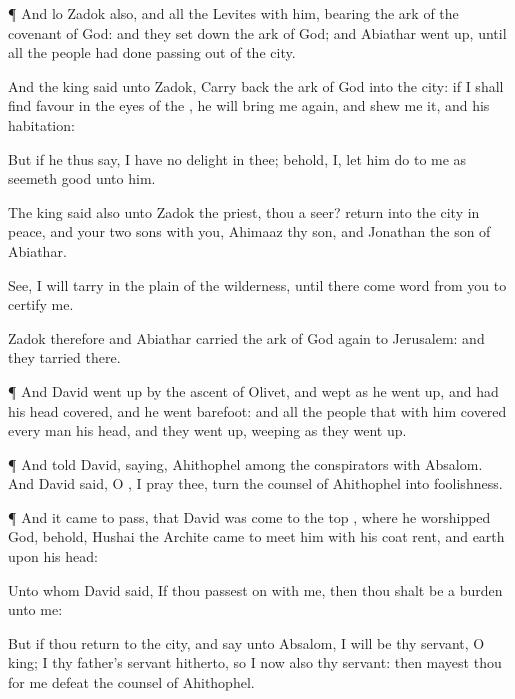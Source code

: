 {\par }{\PP {}¶ And lo
Zadok also, and all the
Levites
{} with him,
bearing the
ark of the
covenant of
God: and they set
down the
ark of
God; and
Abiathar went
up, until all the
people had
done
passing out of the
city.

And the
king
said unto
Zadok, Carry
back the
ark of
God into the
city: if I shall
find
favour in the
eyes of the
{}, he will bring me
again, and
shew me
{} it, and his
habitation:

But if he thus
say, I have no
delight in thee; behold,
{} I, let him
do to me as
seemeth
good unto him.

The
king
said also unto
Zadok the
priest,
{} thou a
seer?
return into the
city in
peace, and your
two
sons with you,
Ahimaaz thy
son, and
Jonathan the
son of
Abiathar.

See, I will
tarry in the
plain of the
wilderness, until there
come
word from you to
certify me.

Zadok therefore and
Abiathar
carried the
ark of
God
again to
Jerusalem: and they
tarried there.


\par }{\PP {}¶ And
David went
up by the
ascent of
{}
Olivet, and
wept as he went
up, and had his
head
covered, and he
went
barefoot: and all the
people that
{} with him
covered every
man his
head, and they went
up,
weeping as they went
up.


\par }{\PP {}¶ And
{}
told
David,
saying,
Ahithophel
{} among the
conspirators with
Absalom. And
David
said, O
{}, I pray thee, turn the
counsel of
Ahithophel into
foolishness.


\par }{\PP {}¶ And it came to pass, that
{}
David was
come to the
top
{}, where he
worshipped
God, behold,
Hushai the
Archite came to
meet him with his
coat
rent, and
earth upon his
head:

Unto whom
David
said, If thou passest
on with me, then thou shalt be a
burden unto me:

But if thou
return to the
city, and
say unto
Absalom, I will be thy
servant, O
king;
{} I
{} thy
father’s
servant
hitherto, so
{} I now also
{} thy
servant: then mayest thou for me
defeat the
counsel of
Ahithophel.

}
